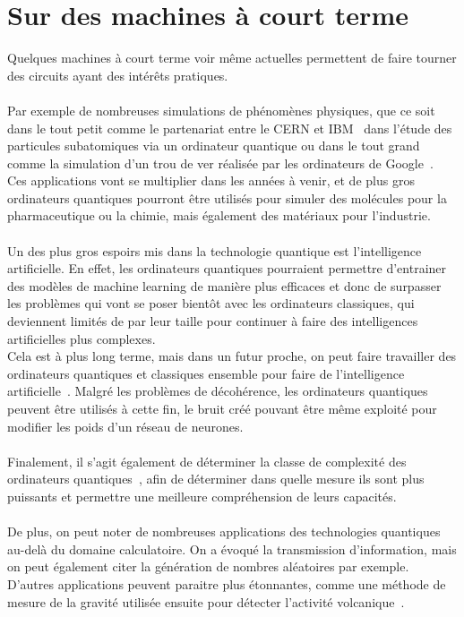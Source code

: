 \chapter{Sur des machines à court terme}\label{ch:sur-des-machines-a-court-terme}

Quelques machines à court terme voir même actuelles permettent de faire tourner
des circuits ayant des intérêts pratiques. \\ \\
Par exemple de nombreuses simulations de phénomènes physiques, que ce soit dans le
tout petit comme le partenariat entre le CERN et IBM~\cite{ibm-cern} dans l'étude des particules
subatomiques via un ordinateur quantique ou dans le tout grand comme la
simulation d'un trou de ver réalisée par les ordinateurs de Google~\cite{wormhole-sim}.\\
Ces applications vont se multiplier dans les années à venir, et de plus gros
ordinateurs quantiques pourront être utilisés pour simuler des molécules pour
la pharmaceutique ou la chimie, mais également des matériaux pour l'industrie.\\ \\
Un des plus gros espoirs mis dans la technologie quantique est l'intelligence
artificielle.
En effet, les ordinateurs quantiques pourraient permettre d'entrainer des
modèles de machine learning de manière plus efficaces et donc de surpasser les
problèmes qui vont se poser bientôt avec les ordinateurs classiques, qui deviennent
limités de par leur taille pour continuer à faire des intelligences artificielles plus complexes.\\
Cela est à plus long terme, mais dans un futur proche, on peut faire travailler
des ordinateurs quantiques et classiques ensemble pour faire de l'intelligence
artificielle~\cite{ia-mixte}.
Malgré les problèmes de décohérence, les ordinateurs quantiques peuvent être
utilisés à cette fin, le bruit créé pouvant être même exploité pour modifier
les poids d'un réseau de neurones.\\ \\
Finalement, il s'agit également de déterminer la classe de complexité des ordinateurs
quantiques~\cite{wiki:complexity-qc}, afin de déterminer dans quelle mesure ils sont plus
puissants et permettre une meilleure compréhension de leurs capacités.\\ \\
De plus, on peut noter de nombreuses applications des technologies quantiques au-delà du domaine
calculatoire.
On a évoqué la transmission d'information, mais on peut également citer la génération de nombres
aléatoires par exemple.
D'autres applications peuvent paraitre plus étonnantes, comme une méthode de mesure de la
gravité utilisée ensuite pour détecter l'activité volcanique~\cite{AntoniMicollier2022}.
